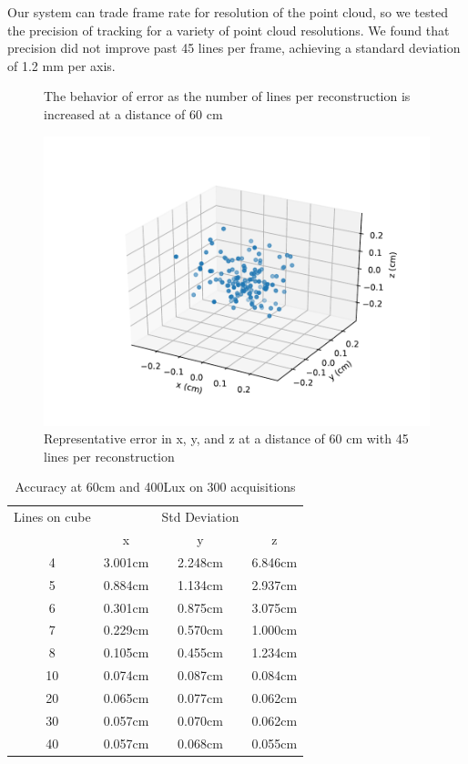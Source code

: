 \documentclass{llncs}
\begin{document}
Our system can trade frame rate for resolution of the point cloud, so we tested the precision of tracking for a variety of point cloud resolutions. We found that precision did not improve past 45 lines per frame, achieving a standard deviation of 1.2 mm per axis.
\begin{figure}
\caption{The behavior of error as the number of lines per reconstruction is increased at a distance of 60 cm}
\end{figure}
\begin{figure}
\includegraphics[scale=.7]{45_lines_error}
\caption{Representative error in x, y, and z at a distance of 60 cm with 45 lines per reconstruction}
\end{figure}

\begin{table}
\caption{Accuracy at 60cm and 400Lux on 300 acquisitions}
\begin{tabular}{c|ccc}
\hline
\hline
Lines on cube & & Std Deviation & \\
 & x & y & z\\
\hline
4  & 3.001cm & 2.248cm & 6.846cm\\
5  & 0.884cm & 1.134cm & 2.937cm\\
6  & 0.301cm & 0.875cm & 3.075cm\\
7  & 0.229cm & 0.570cm & 1.000cm\\
8  & 0.105cm & 0.455cm & 1.234cm\\
10 & 0.074cm & 0.087cm & 0.084cm\\
20 & 0.065cm & 0.077cm & 0.062cm\\
30 & 0.057cm & 0.070cm & 0.062cm\\
40 & 0.057cm & 0.068cm & 0.055cm\\
\hline

\end{tabular}
\centering
\end{table}
\end{document}
